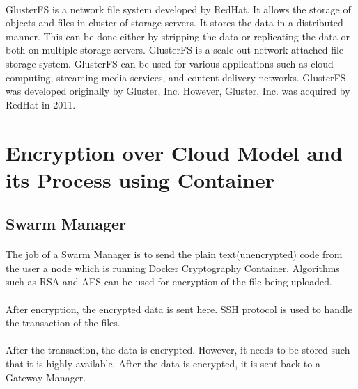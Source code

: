 \paragraph{\hspace{24pt}}
GlusterFS is a network file system developed by RedHat. It allows the storage of objects and files in cluster of storage servers. It stores the data in a distributed manner. This can be done either by stripping the data or replicating the data or both on multiple storage servers. GlusterFS is a scale-out network-attached file storage system. GlusterFS can be used for various applications such as cloud computing, streaming media services, and content delivery networks. GlusterFS was developed originally by Gluster, Inc. However, Gluster, Inc. was acquired by RedHat in 2011.

\section{Encryption over Cloud Model and its Process using Container}

\subsection{Swarm Manager}

\paragraph{\hspace{24pt}}
The job of a Swarm Manager is to send the plain text(unencrypted) code from the user a node which is running Docker Cryptography Container. Algorithms such as RSA and AES can be used for encryption of the file being uploaded.

\paragraph{\hspace{24pt}}
After encryption, the encrypted data is sent here. SSH protocol is used to handle the transaction of the files.

\paragraph{\hspace{24pt}}
After the transaction, the data is encrypted. However, it needs to be stored such that it is highly available. After the data is encrypted, it is sent back to a Gateway Manager.

